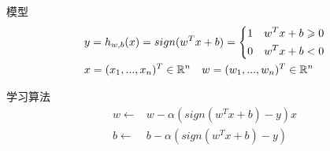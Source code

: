 \begin{frame}[fragile]{模型}
\[\begin{gathered}
  y = {h_{w,b}}(x) = sign({w^T}x + b) = \left\{ \begin{gathered}
  1 \quad {w^T}x + b \geqslant 0 \hfill \\
  0 \quad {w^T}x + b < 0 \hfill \\ 
\end{gathered}  \right. \hfill \\
  x = ({x_1},...,{x_n})^{T} \in {\mathbb{R}^n} \quad w = ({w_1},...,{w_n})^{T} \in {\mathbb{R}^n} \hfill \\ 
\end{gathered} \]
\end{frame}

\begin{frame}[fragile]{学习算法}
\[\begin{aligned}
  w \leftarrow  & w - \alpha \left( sign({w^T}x + b) - y \right)x \\ 
  b \leftarrow  & b - \alpha \left( sign({w^T}x + b) - y \right)  \\ 
\end{aligned} \]
\end{frame}


